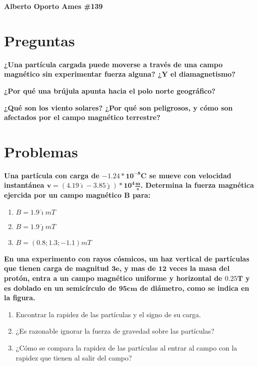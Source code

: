 \documentclass[12pt, twoside]{article}
\begin{document}
\thispagestyle{fancy}

\textbf{Alberto Oporto Ames \#139}

\section*{Preguntas}%

\textbf{¿Una partícula cargada puede moverse a través de una campo magnético
sin experimentar fuerza alguna?
¿Y el diamagnetismo?}

\textbf{¿Por qué una brújula apunta hacia el polo norte geográfico?}

\textbf{¿Qué son los viento solares?
¿Por qué son peligrosos, y cómo son afectados por el campo magnético
terrestre?}

\section*{Problemas}%

\textbf{
	Una partícula con carga de $\mathbf{-1.24*10^{-8}C}$ se mueve con velocidad instantánea
	$\mathbf{v=(4.19\hat{\imath}-3.85\hat{\jmath})*10^4 \frac{m}{s} }$.
	Determina la fuerza magnética ejercida por un campo magnético $\mathbf{B}$ para:
}
\begin{enumerate}[label=\alph*.]
	\item $B=1.9\hat{\imath}mT$
	\item $B=1.9\hat{\jmath}mT$
	\item $B=(0.8;1.3;-1.1)mT$
\end{enumerate}

\textbf{
	En una experimento con rayos cósmicos, un haz vertical de partículas que tienen
	carga de magnitud $\mathbf{3e}$, y mas de $\mathbf{12}$ veces la masa del protón,
	entra a un campo magnético uniforme y horizontal de $\mathbf{0.25T}$ y es doblado
	en un semicírculo de $\mathbf{95cm}$ de diámetro, como se indica en la figura.
}
\begin{enumerate}[label=\alph*.]
	\item Encontrar la rapidez de las partículas y el signo de su carga.
	\item ¿Es razonable ignorar la fuerza de gravedad sobre las partículas?
	\item ¿Cómo se compara la rapidez de las partículas al entrar al campo con
		la rapidez que tienen al salir del campo?
\end{enumerate}
\end{document}
